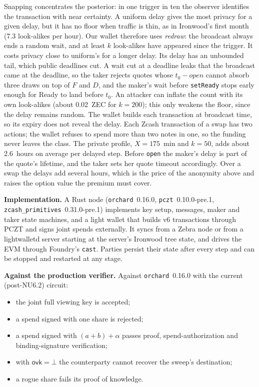\documentclass[10pt,letterpaper]{article}
\makeatletter
\renewcommand\section{\@startsection{section}{1}{\z@}{-1.3em}{0.45em}{\normalfont\large\bfseries}}
\theoremstyle{plain}
\theoremstyle{definition}
\newcommand{\ovk}{\mathsf{ovk}}
\newcommand{\fn}[1]{\texttt{#1}}
\makeatother
\begin{document}
Snapping concentrates the posterior: in one trigger in ten the observer identifies the transaction
with near certainty. A uniform delay gives the most privacy for a given delay, but it has no floor
when traffic is thin, as in Ironwood's first month (7.3 look-alikes per hour). Our wallet therefore
uses \emph{redraw}: the broadcast always ends a random wait, and at least $k$ look-alikes have
appeared since the trigger. It costs privacy close to uniform's for a longer delay. Its delay has
an unbounded tail, which public deadlines cut. A wait cut at a deadline leaks that the broadcast
came at the deadline, so the taker rejects quotes whose $t_0 - \mathit{open}$ cannot absorb three
draws on top of $F$ and $D$, and the maker's wait before \fn{setReady} stops early enough for Ready to land before $t_0$. An attacker can inflate the count with its own look-alikes (about 0.02~ZEC for $k=200$);
this only weakens the floor, since the delay remains random. The wallet builds each transaction at
broadcast time, so its expiry does not reveal the delay. Each Zcash transaction of a swap has two
actions; the wallet refuses to spend more than two notes in one, so the funding never leaves the
class. The private profile, $X=175$~min and $k=50$, adds about 2.6~hours on average per delayed
step. Before \fn{open} the maker's delay is part of the quote's lifetime, and the taker sets her
quote timeout accordingly. Over a swap the delays add several hours, which is the price of the
anonymity above and raises the option value the premium must cover.

\section{Implementation and Evaluation}

\textbf{Implementation.} A Rust node (\fn{orchard}~0.16.0, \fn{pczt}~0.10.0-pre.1,
\fn{zcash\_primitives}~0.31.0-pre.1) implements key setup, messages, maker and taker state
machines, and a light wallet that builds v6 transactions through PCZT and signs joint spends
externally. It syncs from a Zebra node or from a lightwalletd server starting at the server's
Ironwood tree state, and drives the EVM through Foundry's \fn{cast}. Parties persist their state
after every step and can be stopped and restarted at any stage.

\textbf{Against the production verifier.} Against \fn{orchard}~0.16.0 with the current (post-NU6.2) circuit:
\begin{itemize}\setlength\itemsep{0.05em}
\item the joint full viewing key is accepted;
\item a spend signed with one share is rejected;
\item a spend signed with $(a+b)+\alpha$ passes proof, spend-authorization and binding-signature
verification;
\item with $\ovk=\bot$ the counterparty cannot recover the sweep's destination;
\item a rogue share fails its proof of knowledge.
\end{itemize}
\end{document}
